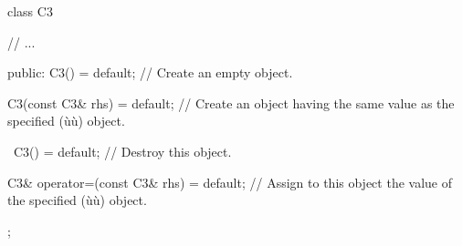\begin{emcppslisting}
class C3
{
     // ...

public:
   C3() = default;
       // Create an empty object.

   C3(const C3& rhs) = default;
       // Create an object having the same value as the specified (ù{}ù) object.

   ~C3() = default;
       // Destroy this object.

   C3& operator=(const C3& rhs) = default;
       // Assign to this object the value of the specified (ù{}ù) object.
};
\end{emcppslisting}


%
%
%
%
